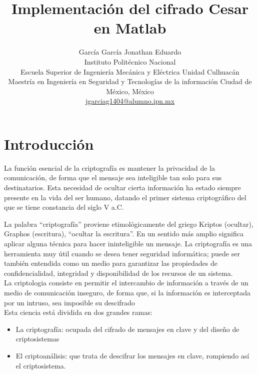 \documentclass[journal,onecolumn]{IEEEtran}
\begin{document}
\title{Implementación del cifrado Cesar en Matlab}

\author{
    García García Jonathan Eduardo\\
    Instituto Politécnico Nacional\\
    Escuela Superior de Ingeniería Mecánica y Eléctrica Unidad Culhuacán\\
    Maestría en Ingeniería en Seguridad y Tecnologías de la información 
    Ciudad de México, México\\
    \href{jgarciag1404@alumno.ipn.mxm}{jgarciag1404@alumno.ipn.mx} 
     }
\maketitle

\section{Introducción}
\noindent
La función esencial de la criptografía es mantener la privacidad de la
comunicación, de forma que el mensaje sea inteligible tan solo para sus destinatarios.
Esta necesidad de ocultar cierta información ha estado siempre presente en la vida del
ser humano, datando el primer sistema criptográfico del que se tiene constancia del siglo
V a.C. 

La palabra “criptografía” proviene
etimológicamente del griego Kriptos (ocultar), Graphos
(escritura), “ocultar la escritura”. En un sentido más
amplio significa aplicar alguna técnica para hacer
ininteligible un mensaje. La criptografía es una
herramienta muy útil cuando se desea tener seguridad
informática; puede ser también entendida como un
medio para garantizar las propiedades de
confidencialidad, integridad y disponibilidad de los
recursos de un sistema. \\
La criptologia consiste
en permitir el intercambio de información a través de un
medio de comunicación inseguro, de forma que, si la
información es interceptada por un intruso, sea
imposible su descifrado\\
Esta ciencia está dividida en dos
grandes ramas:
\begin{itemize}
    \item La criptografía: ocupada del cifrado de
    mensajes en clave y del diseño de criptosistemas
    \item El criptoanálisis: que trata de descifrar los
    mensajes en clave, rompiendo así el criptosistema.
\end{itemize}
\end{document}
